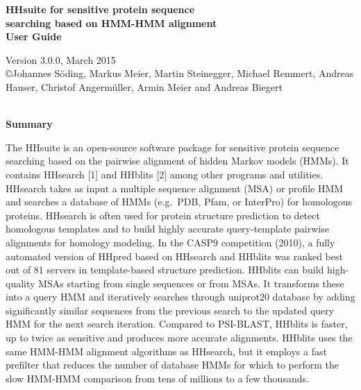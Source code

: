 \documentclass[11pt,a4paper]{article}
\newcommand{\hhversion}{Version 3.0.0, March 2015}
\begin{document}


\begin{center}

\vspace{20mm}
 
{\huge \bf HHsuite for sensitive protein sequence\\[2mm] searching based on HMM-HMM alignment}\\[4mm] 

{\Large \bf User Guide}

  \hhversion\\[2mm]
{\copyright  Johannes S\"oding, Markus Meier, Martin Steinegger, Michael Remmert, Andreas Hauser, Christof Angerm\"uller, Armin Meier and Andreas Biegert}\\[2mm]\


{\bf \Large Summary}

\end{center}

\noindent The HHsuite is an open-source software package for sensitive protein sequence searching based on the pairwise alignment of hidden Markov models (HMMs). It contains HHsearch [1] and HHblits [2] among other programs and utilities. HHsearch takes as input a multiple sequence alignment (MSA) or profile HMM and searches a database of HMMs (e.g.\ PDB, Pfam, or InterPro) for homologous proteins. HHsearch is often used for protein structure prediction to detect homologous templates and to build highly accurate query-template pairwise alignments for homology modeling. In the CASP9 competition (2010), a fully automated version of HHpred based on HHsearch and HHblits was ranked best out of 81 servers in template-based structure prediction. HHblits can build high-quality MSAs starting from single sequences or from MSAs. It transforms these into a query HMM and iteratively searches through uniprot20 database by adding significantly similar sequences from the previous search to the updated query HMM for the next search iteration. Compared to PSI-BLAST, HHblits is faster, up to twice as sensitive and produces more accurate alignments. HHblits uses the same HMM-HMM alignment algorithms as HHsearch, but it employs a fast prefilter that reduces the number of database HMMs for which to perform the slow HMM-HMM comparison from tens of millions to a few thousands. 
\\[2mm]
\end{document}
